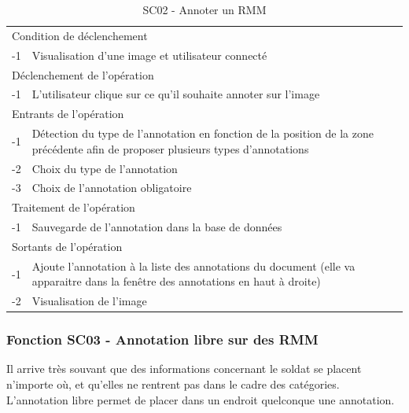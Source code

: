 \documentclass[a4paper]{article}
\begin{document}
\begin{table}[H]
  \centering
   \small
	\begin{tabular}{|c|p{12cm}|}
   		\hline
   			\rowcolor{lightgray}\multicolumn{2}{|c|}{\textbf{SC02 - Annoter un RMM}} \\
   		\hline
   			\multicolumn{2}{|l|}{Condition de d\'eclenchement} \\
   		\hline
   			-1 & Visualisation d’une image et utilisateur connecté\\
   		\hline
   			\multicolumn{2}{|l|}{D\'eclenchement de l'op\'eration} \\
   		\hline
   			-1 & L’utilisateur clique sur ce qu’il souhaite annoter sur l’image\\
   		\hline
   			\multicolumn{2}{|l|}{Entrants de l'op\'eration} \\
   		\hline
   			-1 & Détection du type de l’annotation en fonction de la position de la zone précédente afin de proposer plusieurs types d’annotations\\
            -2 & Choix du type de l’annotation \\
			-3 & Choix de l’annotation obligatoire \\
   		\hline
   			\multicolumn{2}{|l|}{Traitement de l'op\'eration} \\
  		\hline
   			-1 & Sauvegarde de l’annotation dans la base de données\\
   		\hline
   			\multicolumn{2}{|l|}{Sortants de l'op\'eration} \\
   		\hline
   			-1 & Ajoute l’annotation à la liste des annotations du document (elle va apparaitre dans la fenêtre des annotations en haut à droite)\\
			-2 & Visualisation de l’image\\
   		\hline
	\end{tabular}
  \caption{SC02 - Annoter un RMM}
  \normalsize
  \label{tab:annoter_registre}
\end{table}

\subsubsection{Fonction SC03 - Annotation libre sur des RMM}
Il arrive tr\`es souvant que des informations concernant le soldat se placent n'importe o\`u, et qu'elles ne rentrent pas dans le cadre des cat\'egories. L'annotation libre permet de placer dans un endroit quelconque une annotation. \\
\end{document}
